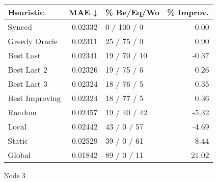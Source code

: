 \begin{tabular}{lrlr}
\toprule
\textbf{Heuristic} & \textbf{MAE ↓} & \textbf{\% Be/Eq/Wo} & \textbf{\% Improv.} \\
\midrule
            Synced &        0.02332 &          0 / 100 / 0 &                0.00 \\
     Greedy Oracle &        0.02311 &          25 / 75 / 0 &                0.90 \\
         Best Last &        0.02341 &         19 / 70 / 10 &               -0.37 \\
       Best Last 2 &        0.02326 &          19 / 75 / 6 &                0.26 \\
       Best Last 3 &        0.02324 &          18 / 76 / 5 &                0.35 \\
    Best Improving &        0.02324 &          18 / 77 / 5 &                0.36 \\
            Random &        0.02457 &         19 / 40 / 42 &               -5.32 \\
             Local &        0.02442 &          43 / 0 / 57 &               -4.69 \\
            Static &        0.02529 &          39 / 0 / 61 &               -8.44 \\
            Global &        0.01842 &          89 / 0 / 11 &               21.02 \\
\bottomrule
\end{tabular}
\caption{Node 3}
\label{tab:iid_lr05_le1_bs4_3}
